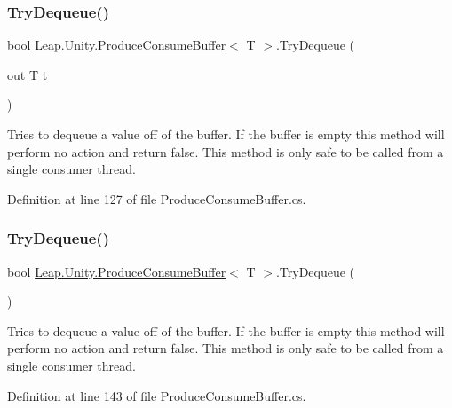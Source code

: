 \subsubsection{\texorpdfstring{TryDequeue()}{TryDequeue()}\hspace{0.1cm}{\footnotesize\ttfamily [1/2]}}
{\footnotesize\ttfamily bool \mbox{\hyperlink{class_leap_1_1_unity_1_1_produce_consume_buffer}{Leap.\+Unity.\+Produce\+Consume\+Buffer}}$<$ T $>$.Try\+Dequeue (\begin{DoxyParamCaption}\item[{out T}]{t }\end{DoxyParamCaption})}



Tries to dequeue a value off of the buffer. If the buffer is empty this method will perform no action and return false. This method is only safe to be called from a single consumer thread. 



Definition at line 127 of file Produce\+Consume\+Buffer.\+cs.

\mbox{\label{class_leap_1_1_unity_1_1_produce_consume_buffer_a0a756b193a73f2ab9dd21a89dce33b65}} 
\subsubsection{\texorpdfstring{TryDequeue()}{TryDequeue()}\hspace{0.1cm}{\footnotesize\ttfamily [2/2]}}
{\footnotesize\ttfamily bool \mbox{\hyperlink{class_leap_1_1_unity_1_1_produce_consume_buffer}{Leap.\+Unity.\+Produce\+Consume\+Buffer}}$<$ T $>$.Try\+Dequeue (\begin{DoxyParamCaption}{ }\end{DoxyParamCaption})}



Tries to dequeue a value off of the buffer. If the buffer is empty this method will perform no action and return false. This method is only safe to be called from a single consumer thread. 



Definition at line 143 of file Produce\+Consume\+Buffer.\+cs.

\mbox{\label{class_leap_1_1_unity_1_1_produce_consume_buffer_a72a0d4ce3f8ec48ed46fa80f5944f988}} 
